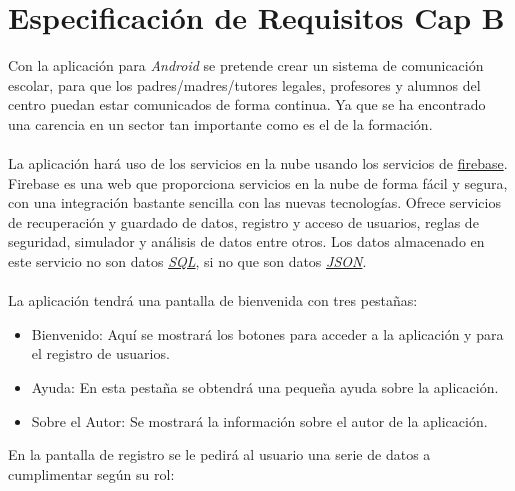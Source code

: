 %
%
%
%

\cleardoublepage
\chapter{Especificación de Requisitos Cap B}
\label{chap:requirementsB}

Con la aplicación \CollegeApp para \textit{Android} se pretende crear un sistema de comunicación escolar, para que los padres/madres/tutores legales, profesores y alumnos del centro puedan estar comunicados de forma continua. Ya que se ha encontrado una carencia en un sector tan importante como es el de la formación.\\
\\ 
La aplicación hará uso de los servicios en la nube usando los servicios de \href{https://www.firebase.com/}{firebase}\cite{6:firebase:online}.
Firebase es una web que proporciona servicios en la nube de forma fácil y segura, con una integración bastante sencilla con las nuevas tecnologías. Ofrece servicios de recuperación y guardado de datos, registro y acceso de usuarios, reglas de seguridad, simulador y análisis de datos entre otros. Los datos almacenado en este servicio no son datos \href{http://es.wikipedia.org/wiki/SQL}{\textit{SQL}}\cite{8:jquery:online}\cite{9:jquery:online}, si no que son datos \href{http://es.wikipedia.org/wiki/JSON}{\textit{JSON}}\cite{7:json:online}.\\
\\
La aplicación tendrá una pantalla de bienvenida con tres pestañas:
\begin{itemize}
	\item Bienvenido: Aquí se mostrará los botones para acceder a la aplicación y para el registro de usuarios.
	\item Ayuda: En esta pestaña se obtendrá una pequeña ayuda sobre la aplicación.
	\item Sobre el Autor: Se mostrará la información sobre el autor de la aplicación.
\end{itemize}
En la pantalla de registro se le pedirá al usuario una serie de datos a cumplimentar según su rol: 
